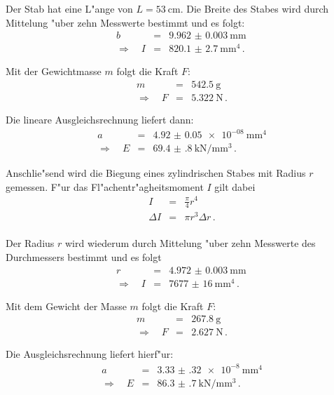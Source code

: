 		Der Stab hat eine L"ange von $L = \SI{53}{\centi \meter}$. Die Breite des Stabes wird durch Mittelung "uber zehn Messwerte bestimmt und es folgt:
		\begin{eqnarray*}
			b & = & \SI{9.962(3)}{\milli \meter} \, \\
			\Rightarrow \quad I & = & \SI{820.1(27)}{\milli \meter \tothe{4}} \,. 
		\end{eqnarray*}

		Mit der Gewichtmasse $m$ folgt die Kraft $F$:
		\begin{eqnarray*}
			m & = & \SI{542.5}{\gram} \, \\
			\Rightarrow \quad F & = & \SI{5.322}{\newton} \,.
		\end{eqnarray*}

		Die lineare Ausgleichsrechnung liefert dann:
		\begin{eqnarray*}
			a & = & \SI{4.92(5)e-08}{\milli \meter \tothe{4}} \\
			\Rightarrow \quad E & = & \SI{69.4(8)}{\kilo \newton \per \milli \meter \cubed} \,.
		\end{eqnarray*}

		Anschlie"send wird die Biegung eines zylindrischen Stabes mit Radius $r$ gemessen.
		F"ur das Fl"achentr"agheitsmoment $I$ gilt dabei
		\begin{eqnarray*}
			I & = & \frac{\pi}{4}r^4 \,\\
			\Delta I & = & \pi r^3 \Delta r \,. \\
		\end{eqnarray*}

		Der Radius $r$ wird wiederum durch Mittelung "uber zehn Messwerte des Durchmessers bestimmt und es folgt
		\begin{eqnarray*}
			r & = & \SI{4.972(3)}{\milli \meter} \, \\
			\Rightarrow \quad I & = & \SI{7677(16)}{\milli \meter \tothe{4}} \,. 
		\end{eqnarray*}

		Mit dem Gewicht der Masse $m$ folgt die Kraft $F$:
		\begin{eqnarray*}
			m & = & \SI{267.8}{\gram} \, \\
			\Rightarrow \quad F & = & \SI{2.627}{\newton} \,.
		\end{eqnarray*}

		Die Ausgleichsrechnung liefert hierf"ur:
		\begin{eqnarray*}
			a & = & \SI{3.33(32)e-8}{\milli \meter \tothe{4}} \\
			\Rightarrow \quad E & = & \SI{86.3(7)}{\kilo \newton \per \milli \meter \cubed} \,.
		\end{eqnarray*}

